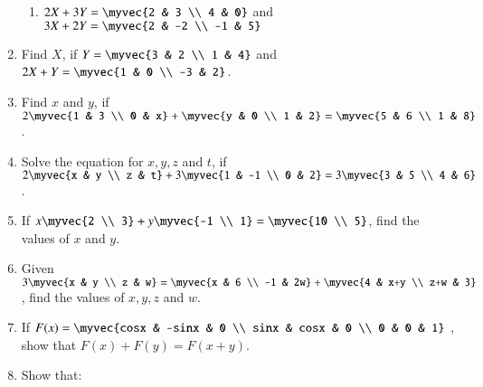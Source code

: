 \documentclass{article}
\theoremstyle{remark}
\begin{document}
\begin{enumerate}
\begin{enumerate}[label=(\roman*)]
\item $2X+3Y=\myvec
{2 & 3 \\ 4 & 0}$ and $3X+2Y=\myvec
{2 & -2 \\ -1 & 5}$
\end{enumerate}
\item Find $X$, if $Y=\myvec
{3 & 2 \\ 1 & 4}$  and $2X+Y=\myvec
{1 & 0 \\ -3 & 2}$.
\item Find $x$ and $y$, if $2 \myvec
{1 & 3 \\ 0 & x}+ \myvec
{y & 0 \\ 1 & 2}= \myvec
{5 & 6 \\ 1 & 8}$.
\item Solve the equation for $x, y, z$ and $t$, if $2 \myvec
{x & y \\ z & t} + 3 \myvec
{1 & -1 \\ 0 & 2} = 3 \myvec
{3 & 5 \\ 4 & 6}$.
\item If $x \myvec
{2 \\ 3} + y \myvec
{-1 \\ 1}= \myvec
{10 \\ 5}$, find the values of $x$ and $y$.
\item Given $3 \myvec
{x & y \\ z & w}=\myvec
{x & 6 \\ -1 & 2w}+ \myvec
{4 & x+y \\ z+w & 3}$, find the values of $x, y, z$ and $w$.
\item If $F(x)=\myvec
{cosx & -sinx & 0 \\ sinx & cosx & 0 \\ 0 & 0 & 1}$ , show that $F(x)+F(y)=F(x+y)$.
\item Show that:
\end{enumerate}
\end{document}
